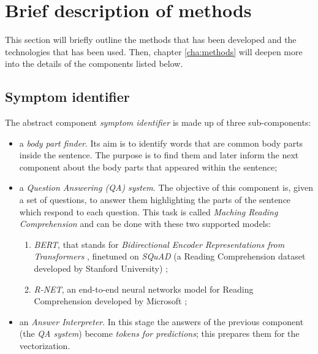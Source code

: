 \section{Brief description of methods}
\label{sec:brief_methods}

This section will briefly outline the methods that has been developed and the technologies that has been used. Then, chapter \ref{cha:methods} will deepen more into the details of the components listed below.

\subsection*{Symptom identifier}
The abstract component \textit{symptom identifier} is made up of three sub-components:
\begin{itemize}
  \item a \textit{body part finder}. Its aim is to identify words that are common body parts inside the sentence. The purpose is to find them and later inform the next component about the body parts that appeared within the sentence;
  \item a \textit{Question Answering (QA) system}. The objective of this component is, given a set of questions, to answer them highlighting the parts of the sentence which respond to each question. This task is called \textit{Maching Reading Comprehension} and can be done with these two supported models:
    \begin{enumerate}
      \item \textit{BERT}, that stands for \textit{Bidirectional Encoder Representations from Transformers} \cite{bert}, finetuned on \textit{SQuAD} (a Reading Comprehension dataset developed by Stanford University) \cite{squad};
      \item \textit{R-NET}, an end-to-end neural networks model for Reading Comprehension developed by Microsoft  \cite{rnet};
    \end{enumerate}
  \item an \textit{Answer Interpreter}. In this stage the answers of the previous component (the \textit{QA system}) become \textit{tokens for predictions}; this prepares them for the vectorization.
\end{itemize}


